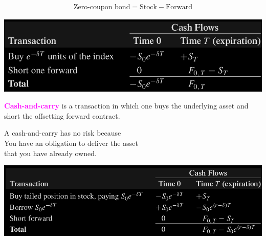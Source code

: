 \begin{frame}[fragile,t]
\begin{center}
	\begin{align*}
		\text{Zero-coupon bond} =	\text{Stock} - \text{Forward}
	\end{align*}

	\includegraphics[scale=0.25]{figs/Table-5-5.png}
\end{center}
\end{frame}
\begin{frame}[fragile,t]
\begin{center}
	\textcolor{magenta}{\bf Cash-and-carry} is a transaction in which one buys the underlying asset
	and short the offsetting forward contract.\\
	\bigskip


	A cash-and-carry has no risk because \\
	You have an obligation to deliver the asset\\  that you have already owned.
	\bigskip

	\includegraphics[scale=0.25]{figs/Table-5-6.png}

\end{center}
\end{frame}
